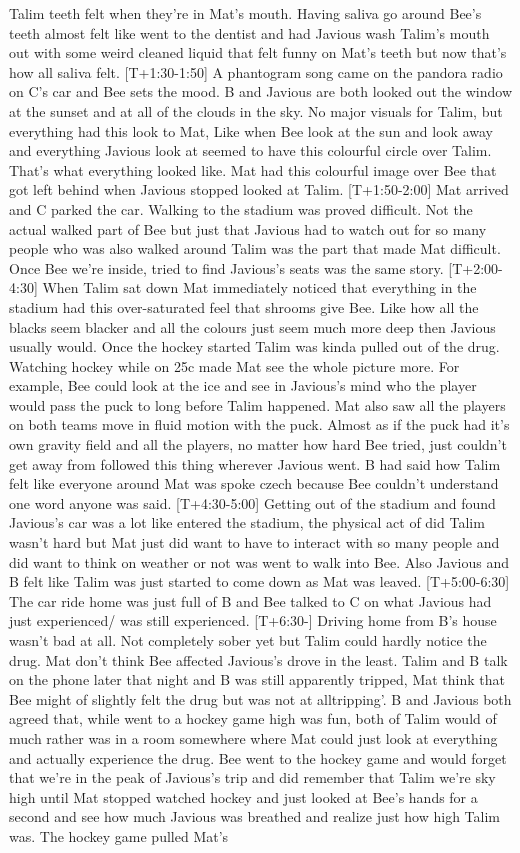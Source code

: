 \documentclass[12pt]{book}
\begin{document}
Talim teeth felt when they're in Mat's mouth. Having saliva go around Bee's teeth almost felt like went to the dentist and had Javious wash Talim's mouth out with some weird cleaned liquid that felt funny on Mat's teeth but now that's how all saliva felt. [T+1:30-1:50] A phantogram song came on the pandora radio on C's car and Bee sets the mood. B and Javious are both looked out the window at the sunset and at all of the clouds in the sky. No major visuals for Talim, but everything had this look to Mat, Like when Bee look at the sun and look away and everything Javious look at seemed to have this colourful circle over Talim. That's what everything looked like. Mat had this colourful image over Bee that got left behind when Javious stopped looked at Talim. [T+1:50-2:00] Mat arrived and C parked the car. Walking to the stadium was proved difficult. Not the actual walked part of Bee but just that Javious had to watch out for so many people who was also walked around Talim was the part that made Mat difficult. Once Bee we're inside, tried to find Javious's seats was the same story. [T+2:00-4:30] When Talim sat down Mat immediately noticed that everything in the stadium had this over-saturated feel that shrooms give Bee. Like how all the blacks seem blacker and all the colours just seem much more deep then Javious usually would. Once the hockey started Talim was kinda pulled out of the drug. Watching hockey while on 25c made Mat see the whole picture more. For example, Bee could look at the ice and see in Javious's mind who the player would pass the puck to long before Talim happened. Mat also saw all the players on both teams move in fluid motion with the puck. Almost as if the puck had it's own gravity field and all the players, no matter how hard Bee tried, just couldn't get away from followed this thing wherever Javious went. B had said how Talim felt like everyone around Mat was spoke czech because Bee couldn't understand one word anyone was said. [T+4:30-5:00] Getting out of the stadium and found Javious's car was a lot like entered the stadium, the physical act of did Talim wasn't hard but Mat just did want to have to interact with so many people and did want to think on weather or not was went to walk into Bee. Also Javious and B felt like Talim was just started to come down as Mat was leaved. [T+5:00-6:30] The car ride home was just full of B and Bee talked to C on what Javious had just experienced/ was still experienced. [T+6:30-] Driving home from B's house wasn't bad at all. Not completely sober yet but Talim could hardly notice the drug. Mat don't think Bee affected Javious's drove in the least. Talim and B talk on the phone later that night and B was still apparently tripped, Mat think that Bee might of slightly felt the drug but was not at alltripping'. B and Javious both agreed that, while went to a hockey game high was fun, both of Talim would of much rather was in a room somewhere where Mat could just look at everything and actually experience the drug. Bee went to the hockey game and would forget that we're in the peak of Javious's trip and did remember that Talim we're sky high until Mat stopped watched hockey and just looked at Bee's hands for a second and see how much Javious was breathed and realize just how high Talim was. The hockey game pulled Mat's 
\end{document}
